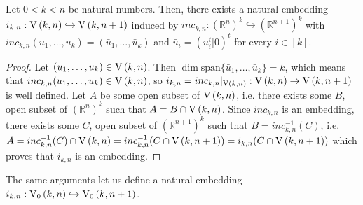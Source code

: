 \begin{lemma} Let $0<k<n$ be natural numbers. Then, there exists a natural embedding $i_{k,n}:\St{k}{n}\hookrightarrow\St{k}{n+1}$ induced by $inc_{k,n}:(\mathbb{R}^n)^k\hookrightarrow(\mathbb{R}^{n+1})^k$ with $inc_{k,n}(u_1,\ldots,u_k)=(\bar{u}_1,\ldots,\bar{u}_k)$ and $\bar{u}_i=(u_i^t|0)^t$ for every $i\in[k]$.
\end{lemma}
\begin{proof} Let $(u_1,\ldots,u_k)\in\St{k}{n}$. Then $\dim\mathrm{span}\{\bar{u}_1,\ldots,\bar{u}_k\}=k$, which means that $inc_{k,n}(u_1,\ldots,u_k)\in\St{k}{n}$, so $i_{k,n}=inc_{k,n}|_{\St{k}{n}}:\St{k}{n}\to\St{k}{n+1}$ is well defined. Let $A$ be some open subset of $\St{k}{n}$, i.e. there exists some $B$, open subset of $(\mathbb{R}^n)^k$ such that $A=B\cap\St{k}{n}$. Since $inc_{k,n}$ is an embedding, there exists some $C$, open subset of $(\mathbb{R}^{n+1})^k$ such that $B=inc_{k,n}^{-1}(C)$, i.e. $A=inc_{k,n}^{-1}(C)\cap\St{k}{n}=inc_{k,n}^{-1}(C\cap\St{k}{n+1})=i_{k,n}(C\cap\St{k}{n+1})$ which proves that $i_{k,n}$ is an embedding.
\end{proof}
\begin{remark} The same arguments let us define a natural embedding $i_{k,n}:\StO{k}{n}\hookrightarrow\StO{k}{n+1}$.
\end{remark}

